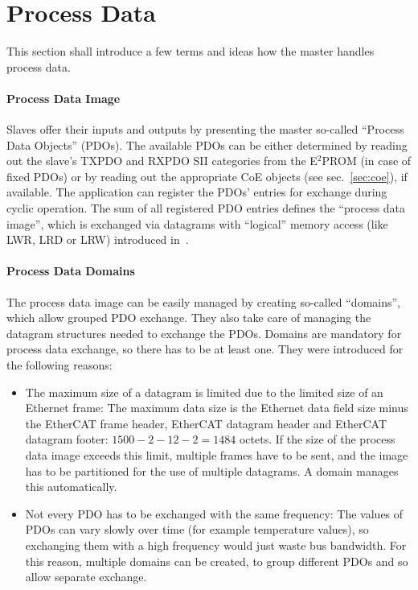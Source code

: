 \documentclass[a4paper,12pt,BCOR6mm,bibtotoc,idxtotoc]{scrbook}
\begin{document}

\section{Process Data}
\label{sec:processdata}

This section shall introduce a few terms and ideas how the master handles
process data.

\paragraph{Process Data Image}

Slaves offer their inputs and outputs by presenting the master so-called
``Process Data Objects'' (PDOs). The available PDOs can be either
determined by reading out the slave's TXPDO and RXPDO SII categories from the
E$^2$PROM (in case of fixed PDOs) or by reading out the appropriate CoE
objects (see sec.~\ref{sec:coe}), if available.  The application can register
the PDOs' entries for exchange during cyclic operation. The sum of all
registered PDO entries defines the ``process data image'', which is exchanged
via datagrams with ``logical'' memory access (like LWR, LRD or LRW) introduced
in~\cite[sec.~5.4]{dlspec}.

\paragraph{Process Data Domains}

The process data image can be easily managed by creating so-called
``domains'', which allow grouped PDO exchange. They also take care of managing
the datagram structures needed to exchange the PDOs. Domains are mandatory for
process data exchange, so there has to be at least one. They were introduced
for the following reasons:

\begin{itemize}

\item The maximum size of a datagram is limited due to the limited size of an
Ethernet frame: The maximum data size is the Ethernet data field size minus
the EtherCAT frame header, EtherCAT datagram header and EtherCAT datagram
footer: $1500 - 2 - 12 - 2 = 1484$ octets. If the size of the process data
image exceeds this limit, multiple frames have to be sent, and the image has
to be partitioned for the use of multiple datagrams. A domain manages this
automatically.

\item Not every PDO has to be exchanged with the same frequency: The values of
PDOs can vary slowly over time (for example temperature values), so exchanging
them with a high frequency would just waste bus bandwidth. For this reason,
multiple domains can be created, to group different PDOs and so allow separate
exchange.

\end{itemize}
\end{document}
